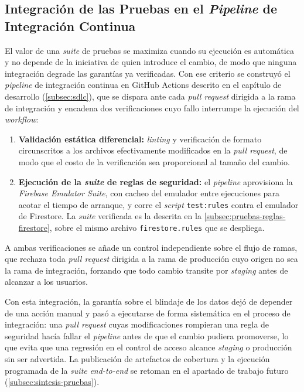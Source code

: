 \subsection{Integración de las Pruebas en el \textit{Pipeline} de Integración Continua}\label{subsec:pruebas-ci}

El valor de una \textit{suite} de pruebas se maximiza cuando su ejecución es automática y no depende de la iniciativa de quien introduce el cambio, de modo que ninguna integración degrade las garantías ya verificadas. Con ese criterio se construyó el \textit{pipeline} de integración continua en GitHub Actions descrito en el capítulo de desarrollo (\autoref{subsec:sdlc}), que se dispara ante cada \textit{pull request} dirigida a la rama de integración y encadena dos verificaciones cuyo fallo interrumpe la ejecución del \textit{workflow}:

\begin{enumerate}
  \item \textbf{Validación estática diferencial:} \textit{linting} y verificación de formato circunscritos a los archivos efectivamente modificados en la \textit{pull request}, de modo que el costo de la verificación sea proporcional al tamaño del cambio.

  \item \textbf{Ejecución de la \textit{suite} de reglas de seguridad:} el \textit{pipeline} aprovisiona la \textit{Firebase Emulator Suite}, con cacheo del emulador entre ejecuciones para acotar el tiempo de arranque, y corre el \textit{script} \texttt{test:rules} contra el emulador de Firestore. La \textit{suite} verificada es la descrita en la \autoref{subsec:pruebas-reglas-firestore}, sobre el mismo archivo \texttt{firestore.rules} que se despliega.
\end{enumerate}

A ambas verificaciones se añade un control independiente sobre el flujo de ramas, que rechaza toda \textit{pull request} dirigida a la rama de producción cuyo origen no sea la rama de integración, forzando que todo cambio transite por \textit{staging} antes de alcanzar a los usuarios.

Con esta integración, la garantía sobre el blindaje de los datos dejó de depender de una acción manual y pasó a ejecutarse de forma sistemática en el proceso de integración: una \textit{pull request} cuyas modificaciones rompieran una regla de seguridad hacía fallar el \textit{pipeline} antes de que el cambio pudiera promoverse, lo que evita que una regresión en el control de acceso alcance \textit{staging} o producción sin ser advertida. La publicación de artefactos de cobertura y la ejecución programada de la \textit{suite} \textit{end-to-end} se retoman en el apartado de trabajo futuro (\autoref{subsec:sintesis-pruebas}).
